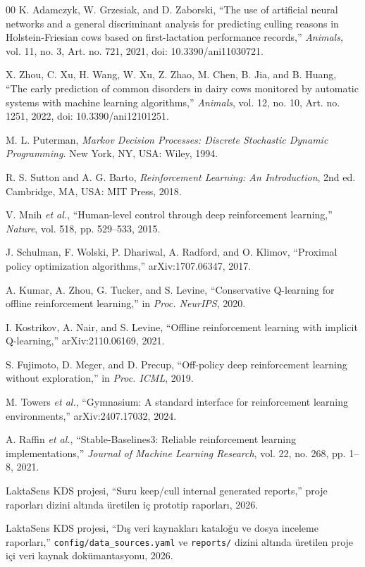 \documentclass[conference]{IEEEtran}
\begin{document}
\begin{thebibliography}{00}
K. Adamczyk, W. Grzesiak, and D. Zaborski, ``The use of artificial neural
networks and a general discriminant analysis for predicting culling reasons in
Holstein-Friesian cows based on first-lactation performance records,''
\emph{Animals}, vol. 11, no. 3, Art. no. 721, 2021,
doi: 10.3390/ani11030721.

X. Zhou, C. Xu, H. Wang, W. Xu, Z. Zhao, M. Chen, B. Jia, and B. Huang, ``The
early prediction of common disorders in dairy cows monitored by automatic
systems with machine learning algorithms,'' \emph{Animals}, vol. 12, no. 10,
Art. no. 1251, 2022, doi: 10.3390/ani12101251.

M. L. Puterman, \emph{Markov Decision Processes: Discrete Stochastic Dynamic
Programming}. New York, NY, USA: Wiley, 1994.

R. S. Sutton and A. G. Barto, \emph{Reinforcement Learning: An Introduction},
2nd ed. Cambridge, MA, USA: MIT Press, 2018.

V. Mnih \emph{et al.}, ``Human-level control through deep reinforcement
learning,'' \emph{Nature}, vol. 518, pp. 529--533, 2015.

J. Schulman, F. Wolski, P. Dhariwal, A. Radford, and O. Klimov, ``Proximal
policy optimization algorithms,'' arXiv:1707.06347, 2017.

A. Kumar, A. Zhou, G. Tucker, and S. Levine, ``Conservative Q-learning for
offline reinforcement learning,'' in \emph{Proc. NeurIPS}, 2020.

I. Kostrikov, A. Nair, and S. Levine, ``Offline reinforcement learning with
implicit Q-learning,'' arXiv:2110.06169, 2021.

S. Fujimoto, D. Meger, and D. Precup, ``Off-policy deep reinforcement learning
without exploration,'' in \emph{Proc. ICML}, 2019.

M. Towers \emph{et al.}, ``Gymnasium: A standard interface for reinforcement
learning environments,'' arXiv:2407.17032, 2024.

A. Raffin \emph{et al.}, ``Stable-Baselines3: Reliable reinforcement learning
implementations,'' \emph{Journal of Machine Learning Research}, vol. 22, no.
268, pp. 1--8, 2021.

LaktaSens KDS projesi, ``Suru keep/cull internal generated reports,'' proje
raporları dizini altında üretilen iç prototip raporları, 2026.

LaktaSens KDS projesi, ``Dış veri kaynakları kataloğu ve dosya inceleme
raporları,'' \texttt{config/data\_sources.yaml} ve \texttt{reports/}
dizini altında üretilen proje içi veri kaynak dokümantasyonu, 2026.

\end{thebibliography}
\end{document}
